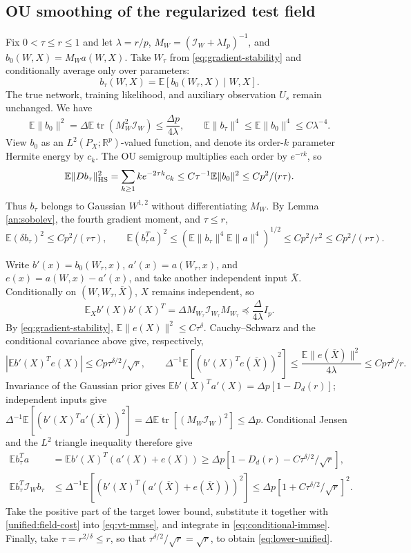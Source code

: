 \documentclass[a4paper]{tufte-handout}
\newcommand{\E}{\mathbb E}
\DeclareMathOperator{\tr}{tr}
\begin{document}
\begin{fullwidth}
\subsection{OU smoothing of the regularized test field}
Fix $0<\tau\le r\le1$ and let $\lambda=r/p$,
$M_W=(\mathcal I_W+\lambda I_p)^{-1}$, and $b_0(W,X)=M_Wa(W,X)$.
Take $W_\tau$ from \eqref{eq:gradient-stability} and conditionally average only over parameters:
\[
 b_\tau(W,X)=\E[b_0(W_\tau,X)\mid W,X].
\]
The true network, training likelihood, and auxiliary observation $U_s$ remain unchanged. We have
\[
 \E\|b_0\|^2=\Delta\E\tr(M_W^2\mathcal I_W)
 \le\frac{\Delta p}{4\lambda},\qquad
 \E\|b_\tau\|^4\le\E\|b_0\|^4\le C\lambda^{-4}.
\]
View $b_0$ as an $L^2(P_X;\mathbb R^p)$-valued function, and denote its order-$k$ parameter Hermite
energy by $c_k$. The OU semigroup multiplies each order by $e^{-\tau k}$, so
\[
 \E\|Db_\tau\|_{\rm HS}^2
 =\sum_{k\ge1}ke^{-2\tau k}c_k
 \le C\tau^{-1}\E\|b_0\|^2\le Cp^2/(r\tau).
\]
Thus $b_\tau$ belongs to Gaussian $W^{1,2}$ without differentiating $M_W$.
By Lemma \ref{an:sobolev}, the fourth gradient moment, and $\tau\le r$,
\begin{equation}\label{unified:field-cost}
 \E(\delta b_\tau)^2\le Cp^2/(r\tau),\qquad
 \E(b_\tau^Ta)^2\le
 (\E\|b_\tau\|^4\E\|a\|^4)^{1/2}
 \le Cp^2/r^2\le Cp^2/(r\tau).
\end{equation}

Write $b'(x)=b_0(W_\tau,x)$, $a'(x)=a(W_\tau,x)$, and
$e(x)=a(W,x)-a'(x)$, and take another independent input $\overline X$.
Conditionally on $(W,W_\tau,\overline X)$, $X$ remains independent, so
\[
 \E_Xb'(X)b'(X)^T=\Delta M_{W_\tau}\mathcal I_{W_\tau}M_{W_\tau}
 \preceq\frac{\Delta}{4\lambda}I_p.
\]
By \eqref{eq:gradient-stability}, $\E\|e(X)\|^2\le C\tau^\delta$.
Cauchy--Schwarz and the conditional covariance above give, respectively,
\[
 |\E b'(X)^Te(X)|\le Cp\tau^{\delta/2}/\sqrt r,
 \qquad
 \Delta^{-1}\E[(b'(X)^Te(\overline X))^2]
 \le\frac{\E\|e(\overline X)\|^2}{4\lambda}\le Cp\tau^\delta/r.
\]
Invariance of the Gaussian prior gives $\E b'(X)^Ta'(X)=\Delta p[1-D_d(r)]$;
independent inputs give
$\Delta^{-1}\E[(b'(X)^Ta'(\overline X))^2]
 =\Delta\E\tr[(M_W\mathcal I_W)^2]\le\Delta p$.
Conditional Jensen and the $L^2$ triangle inequality therefore give
\begin{equation}\label{field:target}\begin{aligned}
 \E b_\tau^Ta&=\E b'(X)^T(a'(X)+e(X))
 \ge\Delta p[1-D_d(r)-C\tau^{\delta/2}/\sqrt r],\\
 \E b_\tau^T\mathcal I_Wb_\tau
 &\le\Delta^{-1}\E[(b'(X)^T(a'(\overline X)+e(\overline X)))^2]
 \le\Delta p[1+C\tau^{\delta/2}/\sqrt r]^2.
\end{aligned}\end{equation}
Take the positive part of the target lower bound, substitute it together with \eqref{unified:field-cost} into
\eqref{eq:vt-mmse}, and integrate in \eqref{eq:conditional-immse}.
Finally, take $\tau=r^{2/\delta}\le r$, so that $\tau^{\delta/2}/\sqrt r=\sqrt r$,
to obtain \eqref{eq:lower-unified}.
\end{fullwidth}
\end{document}
